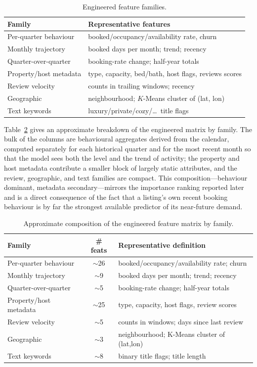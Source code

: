 \documentclass[review,12pt]{elsarticle}
\begin{document}
\begin{table}[!t]
\caption{Engineered feature families.}
\label{tab:featfam}
\centering
\small
\begin{tabular}{lp{1.55in}}
\toprule
Family & Representative features \\
\midrule
Per-quarter behaviour & booked/occupancy/availability rate, churn \\
Monthly trajectory & booked days per month; trend; recency \\
Quarter-over-quarter & booking-rate change; half-year totals \\
Property/host metadata & type, capacity, bed/bath, host flags, reviews scores \\
Review velocity & counts in trailing windows; recency \\
Geographic & neighbourhood; $K$-Means cluster of (lat, lon) \\
Text keywords & luxury/private/cozy/\dots\ title flags \\
\bottomrule
\end{tabular}
\end{table}

Table~\ref{tab:featinv} gives an approximate breakdown of the engineered matrix by
family. The bulk of the columns are behavioural aggregates derived from the
calendar, computed separately for each historical quarter and for the most recent
month so that the model sees both the level and the trend of activity; the property
and host metadata contribute a smaller block of largely static attributes, and the
review, geographic, and text families are compact. This composition---behaviour
dominant, metadata secondary---mirrors the importance ranking reported later and is
a direct consequence of the fact that a listing's own recent booking behaviour is by
far the strongest available predictor of its near-future demand.

\begin{table}[!t]
\caption{Approximate composition of the engineered feature matrix by family.}
\label{tab:featinv}
\centering
\small
\begin{tabular}{lcp{1.25in}}
\toprule
Family & \# feats & Representative definition \\
\midrule
Per-quarter behaviour & $\sim$26 & booked/occupancy/availability rate; churn \\
Monthly trajectory & $\sim$9 & booked days per month; trend; recency \\
Quarter-over-quarter & $\sim$5 & booking-rate change; half-year totals \\
Property/host metadata & $\sim$25 & type, capacity, host flags, review scores \\
Review velocity & $\sim$5 & counts in windows; days since last review \\
Geographic & $\sim$3 & neighbourhood; K-Means cluster of (lat,lon) \\
Text keywords & $\sim$8 & binary title flags; title length \\
\bottomrule
\end{tabular}
\end{table}
\end{document}
